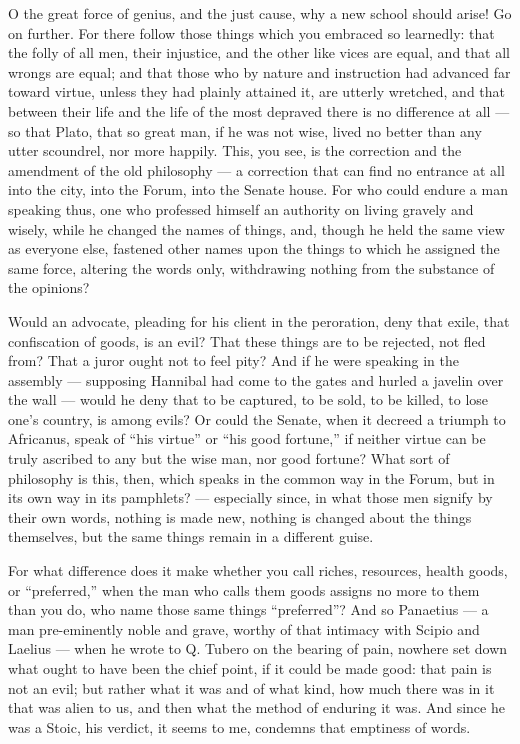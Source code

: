  O the great force of genius, and the just cause, why a new school should arise! Go on further. For there follow those things which you embraced so learnedly: that the folly of all men, their injustice, and the other like vices are equal, and that all wrongs are equal; and that those who by nature and instruction had advanced far toward virtue, unless they had plainly attained it, are utterly wretched, and that between their life and the life of the most depraved there is no difference at all — so that Plato, that so great man, if he was not wise, lived no better than any utter scoundrel, nor more happily. This, you see, is the correction and the amendment of the old philosophy — a correction that can find no entrance at all into the city, into the Forum, into the Senate house. For who could endure a man speaking thus, one who professed himself an authority on living gravely and wisely, while he changed the names of things, and, though he held the same view as everyone else, fastened other names upon the things to which he assigned the same force, altering the words only, withdrawing nothing from the substance of the opinions?

 Would an advocate, pleading for his client in the peroration, deny that exile, that confiscation of goods, is an evil? That these things are to be rejected, not fled from? That a juror ought not to feel pity? And if he were speaking in the assembly — supposing Hannibal had come to the gates and hurled a javelin over the wall — would he deny that to be captured, to be sold, to be killed, to lose one's country, is among evils? Or could the Senate, when it decreed a triumph to Africanus, speak of ``his virtue'' or ``his good fortune,'' if neither virtue can be truly ascribed to any but the wise man, nor good fortune? What sort of philosophy is this, then, which speaks in the common way in the Forum, but in its own way in its pamphlets? — especially since, in what those men signify by their own words, nothing is made new, nothing is changed about the things themselves, but the same things remain in a different guise.

 For what difference does it make whether you call riches, resources, health goods, or ``preferred,'' when the man who calls them goods assigns no more to them than you do, who name those same things ``preferred''? And so Panaetius — a man pre-eminently noble and grave, worthy of that intimacy with Scipio and Laelius — when he wrote to Q. Tubero on the bearing of pain, nowhere set down what ought to have been the chief point, if it could be made good: that pain is not an evil; but rather what it was and of what kind, how much there was in it that was alien to us, and then what the method of enduring it was. And since he was a Stoic, his verdict, it seems to me, condemns that emptiness of words.


